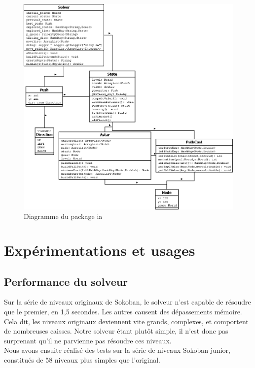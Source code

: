 \documentclass[a4paper,12pt]{article} %
\begin{document}
\begin{figure}[!h]
\centering
\includegraphics[scale=0.3]{images/diag_ia.png}
\caption{Diagramme du package ia}
\end{figure}

\section{Expérimentations et usages}

\subsection{Performance du solveur}

Sur la série de niveaux originaux de Sokoban, le solveur n'est capable de résoudre que le premier, en 1,5 secondes. Les autres causent des dépassements mémoire. Cela dit, les niveaux originaux deviennent vite grands, complexes, et comportent de nombreuses caisses. Notre solveur étant plutôt simple, il n'est donc pas surprenant qu'il ne parvienne pas  résoudre ces niveaux.\\

Nous avons ensuite réalisé des tests sur la série de niveaux Sokoban junior, constitués de 58 niveaux plus simples que l'original.
\end{document}
